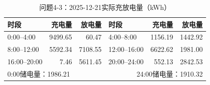 \begin{table}[H]\centering\small
\caption{问题4-3：2025-12-21实际充放电量（kWh）}
\label{tab:q4_3_1221_storage}
\begin{tabular}{lrrlrr}\toprule
时段 & 充电量 & 放电量 & 时段 & 充电量 & 放电量\\\midrule
0:00--4:00 & 9499.65 & 60.47 & 4:00--8:00 & 1156.19 & 1442.92 \\
8:00--12:00 & 5592.34 & 7108.55 & 12:00--16:00 & 6622.62 & 1981.00 \\
16:00--20:00 & 7.46 & 5611.45 & 20:00--24:00 & 552.13 & 2842.53 \\
\midrule\multicolumn{3}{l}{0:00储电量：1986.21} & \multicolumn{3}{r}{24:00储电量：1910.32}\\
\bottomrule\end{tabular}\end{table}
